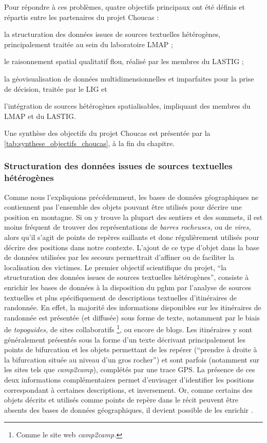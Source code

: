 Pour répondre à ces problèmes, quatre objectifs principaux ont été
définis et répartis entre les partenaires du projet Choucas :%
%
\begin{enumerate*}[label=(\arabic*)]
\item la structuration des données issues de sources textuelles
  hétérogènes, principalement traitée au sein du laboratoire LMAP ;
\item le raisonnement spatial qualitatif flou, réalisé par les membres
  du LASTIG ;
\item la géovisualisation de données multidimensionnelles et
  imparfaites pour la prise de décision, traitée par le LIG et
\item l'intégration de sources hétérogènes spatialisables, impliquant
  des membres du LMAP et du LASTIG.
\end{enumerate*}
%
Une synthèse des objectifs du projet Choucas est présentée par la
\autoref{tab:synthese_objectifs_choucas}, à la fin du chapitre.

\subsubsection{Structuration des données issues de sources textuelles
  hétérogènes}
\label{subsec:1-2-3-1}

Comme nous l’expliquions précédemment, les bases de données
géographiques ne contiennent pas l'ensemble des objets pouvant être
utilisés pour décrire une position en montagne. Si on y trouve la
plupart des sentiers et des sommets, il est moins fréquent de trouver
des représentations de \emph{barres rocheuses,} ou de \emph{vires,}
alors qu'il s'agit de points de repères saillants et donc
régulièrement utilisés pour décrire des positions dans notre
contexte. L'ajout de ce type d'objet dans la base de données utilisées
par les secours permettrait d’affiner ou de faciliter la localisation
des victimes. Le premier objectif scientifique du projet, \enquote{la
  structuration des données issues de sources textuelles hétérogènes},
consiste à enrichir les bases de données à la disposition du \ac{pghm}
par l'analyse de sources textuelles et plus spécifiquement de
descriptions textuelles d'itinéraires de randonnée. En effet, la
majorité des informations disponibles sur les itinéraires de randonnée
est présentée (et diffusée) sous forme de texte, notamment par le
biais de \emph{topoguides,} de sites collaboratifs \footnote{Comme le
  site web \emph{camp2camp.}}, ou encore de blogs. Les itinéraires y
sont généralement présentés sous la forme d'un texte décrivant
principalement les points de bifurcation et les objets permettant de
les repérer (\eg \enquote{prendre à droite à la bifurcation située au
  niveau d'un gros rocher}) et sont parfois (notamment sur les sites
tels que \emph{camp2camp}), complétés par une trace GPS. La présence
de ces deux informations complémentaires permet d'envisager
d'identifier les positions correspondant à certaines descriptions, et
inversement. Or, comme certains des objets décrits et utilisés comme
points de repère dans le récit peuvent être absents des bases de
données géographiques, il devient possible de les enrichir
\autocite{Moncla2019,Medad2018}.


